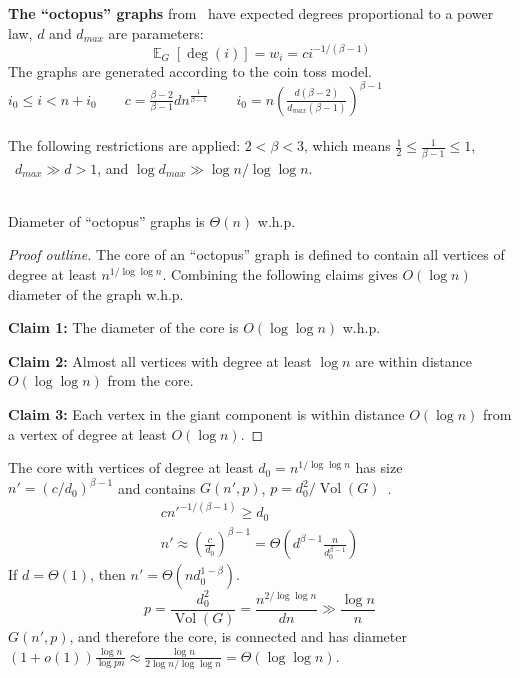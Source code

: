 \documentclass{beamer}
\newcommand{\E}{\mathop{{}\mathbb{E}}}
\DeclareMathOperator*{\Vol}{Vol}
\newcommand{\autotitle}{\secname\ifdefempty{\subsecname}{}{~--- \subsecname}}
\begin{document}
\begin{frame}{\autotitle}
    \textbf{The ``octopus'' graphs} from~\cite{cl04} have expected degrees
    proportional to a power law, $d$ and $d_{max}$ are parameters:
    \begin{equation*}
        \E_G[\deg(i)]=w_i=ci^{-1/(\beta-1)}
    \end{equation*}
    The graphs are generated according to the coin toss model.
    $i_0\leq i<n+i_0
    \qquad c=\frac{\beta-2}{\beta-1}dn^{\frac{1}{\beta-1}}
    \qquad i_0=n\left(\frac{d(\beta-2)}{d_{max}(\beta-1)}\right)^{\beta-1}$\\~\\
    The following restrictions are applied:
    $2<\beta<3$, which means $\frac{1}{2}\leq\frac{1}{\beta-1}\leq 1$,
    $\enspace d_{max}\gg d>1$, and $\log d_{max}\gg \log n/\log\log n$.\\~\\

    \begin{theorem}[\cite{cl04}]
        Diameter of ``octopus'' graphs is $\Theta(n)$ w.h.p.
    \end{theorem}
\end{frame}

\begin{frame}{\autotitle}
    \begin{proof}[Proof outline]
        The core of an ``octopus'' graph is defined to contain all vertices of degree
        at least $n^{1/\log\log n}$.
        Combining the following claims gives $O(\log n)$ diameter of the graph w.h.p.
        
        \textbf{Claim 1:} The diameter of the core is $O(\log\log n)$ w.h.p.
        
        \textbf{Claim 2:} Almost all vertices with degree at least $\log n$ are
        within distance $O(\log\log n)$ from the core.
        
        \textbf{Claim 3:} Each vertex in the giant component is within distance
        $O(\log n)$ from a vertex of degree at least $O(\log n)$.
    \end{proof}
\end{frame}

\begin{frame}{\autotitle}
    The core with vertices of degree at least $d_0=n^{1/\log\log n}$ has size
    $n'=(c/d_0)^{\beta-1}$ and contains $G(n',p)$, $p=d_0^2/\Vol(G)$~\cite{cl04}.
    \begin{gather*}
        cn'^{-1/(\beta-1)}\geq d_0\\
        n'\approx\left(\frac{c}{d_0}\right)^{\beta-1}
        =\Theta\left(d^{\beta-1}\frac{n}{d_0^{\beta-1}}\right)
    \end{gather*}
    If $d=\Theta(1)$, then $n'=\Theta(nd_0^{1-\beta})$.
    \begin{equation*}
        p=\frac{d_0^2}{\Vol(G)}=\frac{n^{2/\log\log n}}{dn}\gg\frac{\log n}{n}
    \end{equation*}
    $G(n',p)$, and therefore the core, is connected and has diameter
    $(1+o(1))\frac{\log n}{\log pn}
    \approx\frac{\log n}{2\log n/\log\log n}=\Theta(\log\log n)$.
\end{frame}
\end{document}
